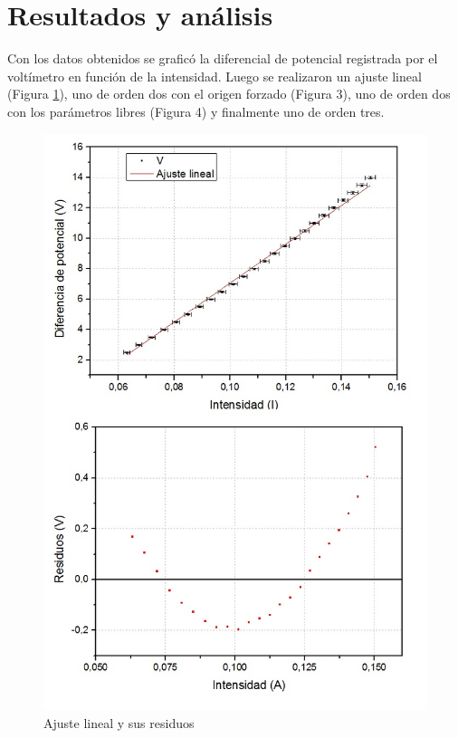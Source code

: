 \documentclass[twoside,twocolumn,a4paper]{article}
\begin{document}
\section{Resultados y an\'alisis}

Con los datos obtenidos se grafic\'o la diferencial de potencial registrada por el volt\'imetro en funci\'on de la intensidad. Luego se realizaron un ajuste lineal (Figura \ref{fig:line}), uno de orden dos con el origen forzado (Figura 3), uno de orden dos con los par\'ametros libres (Figura 4) y finalmente uno de orden tres.\par

\begin{figure}[h]
\includegraphics[width=\linewidth]{fig_line.jpg}
\caption{Ajuste lineal y sus residuos}
\label{fig:line}
\end{figure}
\end{document}
